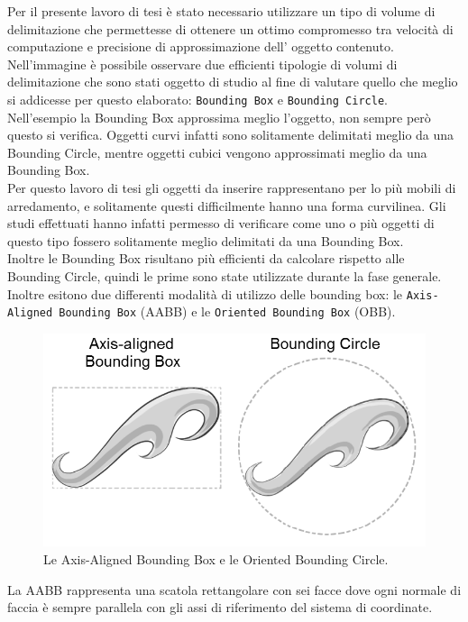Per il presente lavoro di tesi è stato necessario utilizzare un tipo di volume di delimitazione che permettesse di ottenere un ottimo compromesso tra velocità di computazione e precisione di approssimazione dell’ oggetto contenuto.
\\
Nell’immagine è possibile osservare due efficienti tipologie di volumi di delimitazione che sono stati oggetto di studio al fine di valutare quello che meglio si addicesse per questo elaborato: \texttt{Bounding Box} e \texttt{Bounding Circle}.
\\
Nell’esempio la Bounding Box approssima meglio l’oggetto, non sempre però questo si verifica. 
Oggetti curvi infatti sono solitamente delimitati meglio da una Bounding Circle, mentre oggetti cubici vengono approssimati meglio da una Bounding Box.
\\
Per questo lavoro di tesi gli oggetti da inserire rappresentano per lo più mobili di arredamento, e solitamente questi difficilmente hanno una forma curvilinea. Gli studi effettuati hanno infatti permesso di verificare come uno o più oggetti di questo tipo fossero solitamente meglio delimitati da una Bounding Box.
\\
Inoltre le Bounding Box risultano più efficienti da calcolare rispetto alle Bounding Circle, quindi le prime sono state utilizzate durante la fase generale.
Inoltre esitono due differenti modalità di utilizzo delle bounding box: le \texttt{Axis-Aligned Bounding Box} (AABB) e le \texttt{Oriented Bounding Box} (OBB).
\begin{figure}[htb]
 \centering
 \includegraphics[width=1\linewidth]{images/chapter_navigazione_scena/box1.png}\hfill
 \caption[AABB e OBB.]{Le Axis-Aligned Bounding Box e le Oriented Bounding Circle.}
 \label{fig:navigazione_scena_navigator_oculus}
\end{figure}
La AABB rappresenta una scatola rettangolare con sei facce dove ogni normale di faccia è sempre parallela con gli assi di riferimento del sistema di coordinate.
